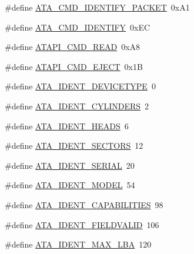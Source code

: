 \begin{DoxyCompactItemize}
\item 
\#define \hyperlink{a00023_acba68da9027d95b9bae53901a8ea009b_acba68da9027d95b9bae53901a8ea009b}{A\+T\+A\+\_\+\+C\+M\+D\+\_\+\+I\+D\+E\+N\+T\+I\+F\+Y\+\_\+\+P\+A\+C\+K\+ET}~0x\+A1
\item 
\#define \hyperlink{a00023_a572958103bba5d355c7fe135ae7526bd_a572958103bba5d355c7fe135ae7526bd}{A\+T\+A\+\_\+\+C\+M\+D\+\_\+\+I\+D\+E\+N\+T\+I\+FY}~0x\+EC
\item 
\#define \hyperlink{a00023_a46c7100054351e7afa8762a5dd165ff5_a46c7100054351e7afa8762a5dd165ff5}{A\+T\+A\+P\+I\+\_\+\+C\+M\+D\+\_\+\+R\+E\+AD}~0x\+A8
\item 
\#define \hyperlink{a00023_a94bf36a7e0a52f4dd421eca62e80631e_a94bf36a7e0a52f4dd421eca62e80631e}{A\+T\+A\+P\+I\+\_\+\+C\+M\+D\+\_\+\+E\+J\+E\+CT}~0x1B
\item 
\#define \hyperlink{a00023_a4224d2160f2f2718d8a67a09bfb8f4a5_a4224d2160f2f2718d8a67a09bfb8f4a5}{A\+T\+A\+\_\+\+I\+D\+E\+N\+T\+\_\+\+D\+E\+V\+I\+C\+E\+T\+Y\+PE}~0
\item 
\#define \hyperlink{a00023_a692fbddd7825db7edba694d647a69aa7_a692fbddd7825db7edba694d647a69aa7}{A\+T\+A\+\_\+\+I\+D\+E\+N\+T\+\_\+\+C\+Y\+L\+I\+N\+D\+E\+RS}~2
\item 
\#define \hyperlink{a00023_a1dcc2ec4b54df2f3cb011bbf6dc3795c_a1dcc2ec4b54df2f3cb011bbf6dc3795c}{A\+T\+A\+\_\+\+I\+D\+E\+N\+T\+\_\+\+H\+E\+A\+DS}~6
\item 
\#define \hyperlink{a00023_ae9be2cb739432bf835c6e5492cf92ba7_ae9be2cb739432bf835c6e5492cf92ba7}{A\+T\+A\+\_\+\+I\+D\+E\+N\+T\+\_\+\+S\+E\+C\+T\+O\+RS}~12
\item 
\#define \hyperlink{a00023_a60e929ababaf71de94d96c079f9028d0_a60e929ababaf71de94d96c079f9028d0}{A\+T\+A\+\_\+\+I\+D\+E\+N\+T\+\_\+\+S\+E\+R\+I\+AL}~20
\item 
\#define \hyperlink{a00023_a9fd52e892928c016a4a66f59a46241e4_a9fd52e892928c016a4a66f59a46241e4}{A\+T\+A\+\_\+\+I\+D\+E\+N\+T\+\_\+\+M\+O\+D\+EL}~54
\item 
\#define \hyperlink{a00023_a4efaa1ae14eb268a085d1824eb2a1f08_a4efaa1ae14eb268a085d1824eb2a1f08}{A\+T\+A\+\_\+\+I\+D\+E\+N\+T\+\_\+\+C\+A\+P\+A\+B\+I\+L\+I\+T\+I\+ES}~98
\item 
\#define \hyperlink{a00023_a4515f6ed07cf67add34766e02bd8d133_a4515f6ed07cf67add34766e02bd8d133}{A\+T\+A\+\_\+\+I\+D\+E\+N\+T\+\_\+\+F\+I\+E\+L\+D\+V\+A\+L\+ID}~106
\item 
\#define \hyperlink{a00023_ae0d046a29ce70e07d868961cf17b54c7_ae0d046a29ce70e07d868961cf17b54c7}{A\+T\+A\+\_\+\+I\+D\+E\+N\+T\+\_\+\+M\+A\+X\+\_\+\+L\+BA}~120

\end{DoxyCompactItemize}
